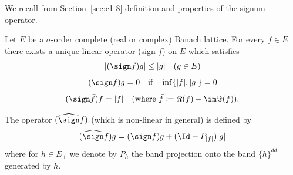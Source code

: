 We recall from Section~\ref{sec:c1-8} definition and properties of the signum operator.
\begin{proposition}\label{prop:c2-2.1}
%
Let $E$ be a $\sigma$-order complete (real or complex) Banach lattice.
For every $f \in E$ there exists a unique linear operator (sign $f$) on $E$ which satisfies
\begin{equation}\label{eq:c2-2.1}
	|(\sign f)g| \leq |g| \quad (g \in E)
\end{equation}
\begin{equation}\label{eq:c2-2.2}
(\sign f)g = 0 \quad \text{if} \quad \inf\{|f|,|g|\} = 0
\end{equation}
\begin{equation}\label{eq:c2-2.3}
(\sign \bar{f})f = |f| \quad \text{(where } \bar{f} \coloneqq \Re(f) - \im\Im(f) \text{)}.
\end{equation}
\end{proposition}
The operator $(\widehat{\sign} f)$ (which is non-linear in general) is defined by
\begin{equation}\label{eq:c2-2.4}
(\widehat{\sign}f)g = (\sign f)g + (\Id - P_{|f|})|g|
\end{equation}
where for $h \in E_{+}$ we denote by $P_h$ the band projection onto the band $\{h\}^{dd}$ generated by $h$.

